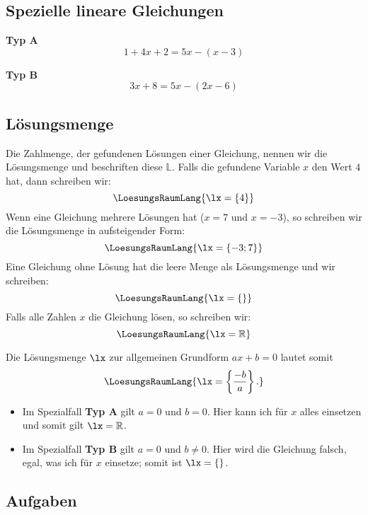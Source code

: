 \TALS{}

\subsection{Spezielle lineare Gleichungen}
\textbf{Typ A}\\

$$1+4x+2 = 5x - (x-3)$$

\textbf{Typ B}\\

$$3x+8 = 5x-(2x-6)$$


\subsection{Lösungsmenge}
  Die Zahlmenge, der gefundenen Lösungen einer Gleichung, nennen wir
  die Lösungsmenge und beschriften diese $\mathbb{L}$. Falls die gefundene
  Variable $x$ \zB{} den Wert $4$ hat, dann schreiben wir:
  $$\LoesungsRaumLang{\lx=\{4\}}$$
  Wenn eine Gleichung mehrere Lösungen hat (\zB $x=7$ und $x=-3$), so
  schreiben wir die Lösungsmenge in aufsteigender Form:
  $$\LoesungsRaumLang{\lx=\{-3; 7\}}$$
  Eine Gleichung ohne Lösung hat die leere Menge als Lösungsmenge und
  wir schreiben:
  $$\LoesungsRaumLang{\lx=\{\}}$$
  Falls alle Zahlen $x$ die Gleichung lösen, so schreiben wir:
  $$\LoesungsRaumLang{\lx=\mathbb{R}}$$

  

Die Lösungsmenge $\lx$ zur allgemeinen Grundform $ax+b=0$ lautet somit $$\LoesungsRaumLang{\lx=\left\{ \frac{-b}{a} \right\}.}$$

\begin{itemize}
  \item Im Spezialfall \textbf{Typ A} gilt $a=0$ und $b=0$. Hier kann ich für $x$ alles einsetzen und somit gilt $\lx=\mathbb{R}$.
  \item Im Spezialfall \textbf{Typ B} gilt $a=0$ und $b\ne 0$. Hier wird die Gleichung falsch, egal, was ich für $x$ einsetze; somit ist $\lx=\{\}$.
\end{itemize}



\subsection*{Aufgaben}


\newpage
